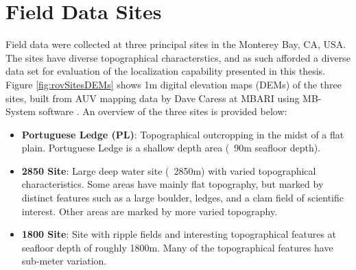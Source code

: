 \section{Field Data Sites}
\label{rov.Field}

Field data were collected at three principal sites in the Monterey Bay, CA, USA.
The sites have diverse topographical characterstics, and as such afforded a diverse data set for evaluation of the localization capability presented in this thesis.
Figure \ref{fig:rovSitesDEMs} shows 1m digital elevation maps (DEMs) of the three sites, built from AUV mapping data by Dave Caress at MBARI using MB-System software \cite{Caress2006}.
An overview of the three sites is provided below:

\begin{itemize}
\item \textbf{Portuguese Ledge (PL)}: Topographical outcropping in the midst of a flat plain. Portuguese Ledge is a shallow depth area (~90m seafloor depth).
\item \textbf{2850 Site}: Large deep water site (~2850m) with varied topographical characteristics.  Some areas have mainly flat topography, but marked by distinct features such as a large boulder, ledges, and a clam field of scientific interest. Other areas are marked by more varied topography.
\item \textbf{1800 Site}: Site with ripple fields and interesting topographical features at seafloor depth of roughly 1800m. Many of the topographical features have sub-meter variation.
\end{itemize}

